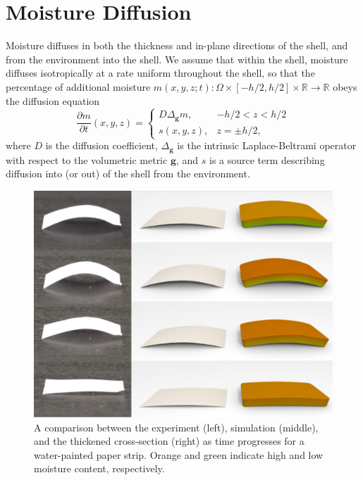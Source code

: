\documentclass[timestamp,acmtog]{acmart}
\newcommand{\bg}{\mathbf{g}}
\begin{document}
\section{Moisture Diffusion}
Moisture diffuses in both the thickness and in-plane directions of the shell, and from the environment into the shell. We assume that within the shell, moisture diffuses isotropically at a rate uniform throughout the shell, so that the percentage of additional moisture $m(x,y,z;t): \Omega\times [-h/2,h/2]\times \mathbb{R}\to\mathbb{R}$ obeys the diffusion equation
\begin{equation}
\frac{\partial m}{\partial t}(x,y,z) = \begin{cases}D\Delta_{\bg} m, & -h/2 < z < h/2\\
s(x,y,z), & z=\pm h/2,\end{cases} \label{eq:diffusion}
\end{equation}
where $D$ is the diffusion coefficient, $\Delta_{\bg}$ is the intrinsic Laplace-Beltrami operator with respect to the volumetric metric $\bg$, and $s$ is a source term describing diffusion into (or out) of the shell from the environment.

\begin{figure}[h]
  \centering
  \includegraphics[width=\linewidth]{WaterPainting.png}
  \caption{A comparison between the experiment (left), simulation (middle), and the thickened cross-section (right) as time progresses for a water-painted paper strip. Orange and green indicate high and low moisture content, respectively.}
  \label{WaterPainting}
\end{figure}
\end{document}

